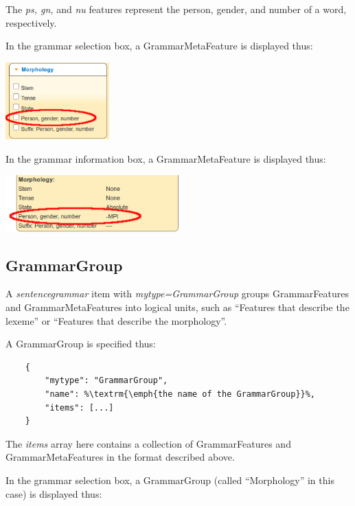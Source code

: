 \documentclass[11pt,oneside,a4paper]{memoir}
\begin{document}
The \emph{ps, gn,} and \emph{nu} features represent the person, gender, and number of a word,
respectively.


\Needspace*{5cm}%
In the grammar selection box, a GrammarMetaFeature is displayed thus:

\begin{center}
  \includegraphics[width=0.3\textwidth]{pgn1.png}
\end{center}

\Needspace*{5cm}%
In the grammar information box, a GrammarMetaFeature is displayed thus:

\begin{center}
  \includegraphics[width=0.5\textwidth]{pgn2.png}
\end{center}


\subsection{GrammarGroup}\label{gg}

A \emph{sentencegrammar} item with \emph{mytype=GrammarGroup} groups GrammarFeatures and
GrammarMetaFeatures into logical units, such as ``Features that describe the lexeme'' or ``Features
that describe the morphology''.

A GrammarGroup is specified thus:

\begin{lstlisting}
    {
        "mytype": "GrammarGroup",
        "name": %\textrm{\emph{the name of the GrammarGroup}}%,
        "items": [...]
    }
\end{lstlisting}

The \emph{items} array here contains a collection of GrammarFeatures and GrammarMetaFeatures in the
format described above.

\Needspace*{5cm}%
In the grammar selection box, a GrammarGroup (called ``Morphology'' in this case) is displayed thus:
\end{document}
